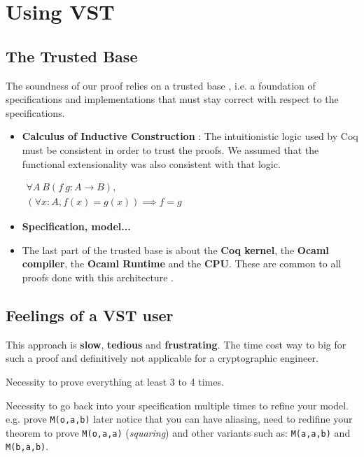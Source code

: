 \section{Using VST}

\subsection{The Trusted Base}

The soundness of our proof relies on a trusted base
, i.e. a foundation of specifications and implementations
that must stay correct with respect to the specifications.

\begin{itemize}
  \item \textbf{Calculus of Inductive Construction} : The intuitionistic logic
  used by Coq must be consistent in order to trust the proofs. We assumed that
  the functional extensionality was also consistent with that logic.

$
\begin{array}{c}
  \forall A\ B (f\ g : A \to B ),\\
  ( \forall x : A , f(x) = g(x) ) \implies f = g
\end{array}
$
  \item \textbf{Specification, model...}

  \item The last part of the trusted base is about the \textbf{Coq kernel}, the
  \textbf{Ocaml compiler}, the \textbf{Ocaml Runtime} and the \textbf{CPU}.
  These are common to all proofs done with this architecture \cite{2015-Appel,coq-faq}.
\end{itemize}

\subsection{Feelings of a VST user}

This approach is \textbf{slow}, \textbf{tedious} and \textbf{frustrating}.
The time cost way to big for such a proof and definitively not applicable for a
cryptographic engineer.

Necessity to prove everything at least 3 to 4 times.

Necessity to go back into your specification multiple times to refine your model.
e.g. prove \texttt{M(o,a,b)} later notice that you can have aliasing, need to redifine
your theorem to prove \texttt{M(o,a,a)} (\textit{squaring}) and other variants such as:
\texttt{M(a,a,b)} and \texttt{M(b,a,b)}.

